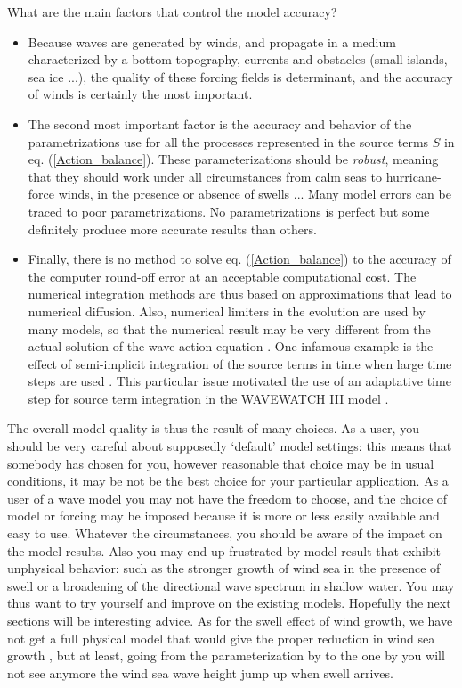 What are the main factors that control the model accuracy?
\begin{itemize}
\item Because waves are generated by winds, and propagate in a medium characterized by a bottom topography, currents and obstacles (small islands, sea ice ...), 
the quality of these forcing fields is determinant, and the accuracy of winds is certainly the most important. 

\item  The second most important factor is the accuracy and behavior of the parametrizations use for all the processes represented 
in the source terms $S$ in eq. (\ref{Action_balance}). These parameterizations should be \emph{robust}, meaning that they should work under all circumstances from 
calm seas to hurricane-force winds, in the presence or absence of swells ...  Many model errors can be traced to poor parametrizations.  No parametrizations is perfect
but some definitely produce more accurate results than others. 

\item Finally, there is no method to solve eq. (\ref{Action_balance}) to the accuracy of the computer round-off error at an acceptable computational cost. 
The numerical integration methods 
are thus based on approximations that lead to numerical diffusion. Also, numerical limiters in the evolution are used by many models, 
so that the numerical result may be very different from the actual solution of the wave action equation \citep[e.g.][]{Tolman2002b}. 
One infamous example is the effect of semi-implicit integration of the source terms in time when large time steps are used 
\citep{Hargreaves&Annan2000}. This particular issue motivated the use of an adaptative time step for source term integration in the 
WAVEWATCH III model \citep{Tolman&al.2014}. 
\end{itemize}

The overall model quality is thus the result of many choices. As a user, you should be very careful about supposedly `default' model settings:
this means that somebody has chosen for you, however reasonable 
that choice may be in usual conditions, it may be not be the best choice for your particular application.  
As a user of a wave model you may not have the freedom to choose, and the choice of model or forcing may be imposed because it is more or less easily available 
and easy to use. Whatever the circumstances, you should be aware  of the impact on the model results. 
Also  you may end up frustrated by model result that exhibit unphysical behavior: such as the stronger growth of wind sea in the presence of swell or 
a broadening of  the directional wave spectrum in shallow water. You  may thus want 
to try yourself and improve on the existing models. Hopefully the next sections will be interesting advice. As for the swell effect of wind growth, 
we have not get a full physical model that would give the proper reduction in wind sea growth \citep{Garcia&al.2012}, but at least, 
going from the parameterization by \cite{Janssen&al.1994} to the one by \cite{Ardhuin&al.2010} you will not see anymore the 
wind sea wave height jump up when swell arrives. 

